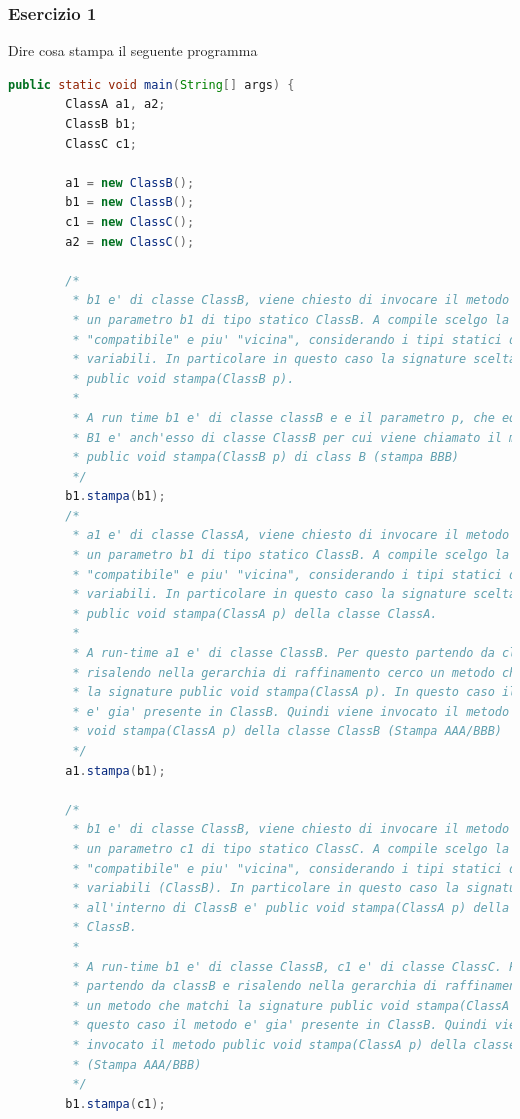 \documentclass{article}
\begin{document}
\subsubsection{Esercizio 1}
Dire cosa stampa il seguente programma 
\begin{lstlisting}[language=Java,escapechar=|]
public static void main(String[] args) {
		ClassA a1, a2;
		ClassB b1;
		ClassC c1;

		a1 = new ClassB();
		b1 = new ClassB();
		c1 = new ClassC();
		a2 = new ClassC();

		/*
		 * b1 e' di classe ClassB, viene chiesto di invocare il metodo stampa su
		 * un parametro b1 di tipo statico ClassB. A compile scelgo la signature
		 * "compatibile" e piu' "vicina", considerando i tipi statici delle
		 * variabili. In particolare in questo caso la signature scelta e'
		 * public void stampa(ClassB p).
		 * 
		 * A run time b1 e' di classe classB e e il parametro p, che equivale a
		 * B1 e' anch'esso di classe ClassB per cui viene chiamato il metodo
		 * public void stampa(ClassB p) di class B (stampa BBB)
		 */
		b1.stampa(b1);
		/*
		 * a1 e' di classe ClassA, viene chiesto di invocare il metodo stampa su
		 * un parametro b1 di tipo statico ClassB. A compile scelgo la signature
		 * "compatibile" e piu' "vicina", considerando i tipi statici delle
		 * variabili. In particolare in questo caso la signature scelta e'
		 * public void stampa(ClassA p) della classe ClassA.
		 * 
		 * A run-time a1 e' di classe ClassB. Per questo partendo da classB e
		 * risalendo nella gerarchia di raffinamento cerco un metodo che matchi
		 * la signature public void stampa(ClassA p). In questo caso il metodo
		 * e' gia' presente in ClassB. Quindi viene invocato il metodo public
		 * void stampa(ClassA p) della classe ClassB (Stampa AAA/BBB)
		 */
		a1.stampa(b1);

		/*
		 * b1 e' di classe ClassB, viene chiesto di invocare il metodo stampa su
		 * un parametro c1 di tipo statico ClassC. A compile scelgo la signature
		 * "compatibile" e piu' "vicina", considerando i tipi statici delle
		 * variabili (ClassB). In particolare in questo caso la signature scelta
		 * all'interno di ClassB e' public void stampa(ClassA p) della classe
		 * ClassB.
		 * 
		 * A run-time b1 e' di classe ClassB, c1 e' di classe ClassC. Per questo
		 * partendo da classB e risalendo nella gerarchia di raffinamento cerco
		 * un metodo che matchi la signature public void stampa(ClassA p). In
		 * questo caso il metodo e' gia' presente in ClassB. Quindi viene
		 * invocato il metodo public void stampa(ClassA p) della classe ClassB
		 * (Stampa AAA/BBB)
		 */
		b1.stampa(c1);


\end{lstlisting}
\end{document}
